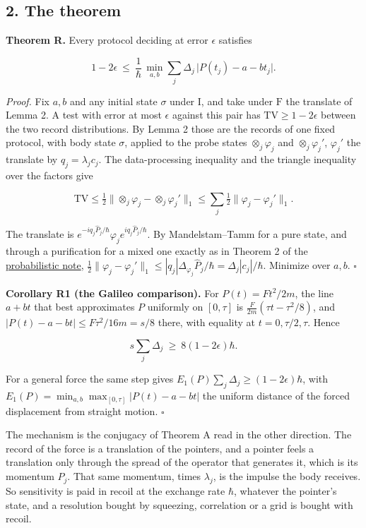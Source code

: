 \documentclass[11pt,a4paper]{article}
\begin{document}
\hypertarget{the-theorem}{%
\subsection{2. The theorem}\label{the-theorem}}

\textbf{Theorem R.} Every protocol deciding at error \(\epsilon\)
satisfies

\[1-2\epsilon\ \le\ \frac1\hbar\,\min_{a,b}\sum_j\Delta_j\,\bigl|P(t_j)-a-bt_j\bigr| .\]

\emph{Proof.} Fix \(a,b\) and any initial state \(\sigma\) under
\(\mathrm I\), and take under \(\mathrm F\) the translate of Lemma 2. A
test with error at most \(\epsilon\) against this pair has
\(\mathrm{TV}\ge1-2\epsilon\) between the two record distributions. By
Lemma 2 those are the records of one fixed protocol, with body state
\(\sigma\), applied to the probe states \(\otimes_j\varphi_j\) and
\(\otimes_j\varphi_j'\), \(\varphi_j'\) the translate by
\(q_j=\lambda_jc_j\). The data-processing inequality and the triangle
inequality over the factors give

\[\mathrm{TV}\le\tfrac12\bigl\|\otimes_j\varphi_j-\otimes_j\varphi_j'\bigr\|_1
\le\sum_j\tfrac12\|\varphi_j-\varphi_j'\|_1 .\]

The translate is
\(e^{-iq_j\hat P_j/\hbar}\varphi_je^{iq_j\hat P_j/\hbar}\). By
Mandelstam--Tamm for a pure state, and through a purification for a
mixed one exactly as in Theorem 2 of the
\href{planck-gap-probabilistic.md}{probabilistic note},
\(\frac12\|\varphi_j-\varphi_j'\|_1\le|q_j|\Delta_{\varphi_j}\hat P_j/\hbar=\Delta_j|c_j|/\hbar\).
Minimize over \(a,b\). \(\square\)

\textbf{Corollary R1 (the Galileo comparison).} For \(P(t)=Ft^2/2m\),
the line \(a+bt\) that best approximates \(P\) uniformly on \([0,\tau]\)
is \(\frac{F}{2m}(\tau t-\tau^2/8)\), and
\(|P(t)-a-bt|\le F\tau^2/16m=s/8\) there, with equality at
\(t=0,\tau/2,\tau\). Hence

\[s\sum_j\Delta_j\ \ge\ 8(1-2\epsilon)\hbar .\]

For a general force the same step gives
\(E_1(P)\sum_j\Delta_j\ge(1-2\epsilon)\hbar\), with
\(E_1(P)=\min_{a,b}\max_{[0,\tau]}|P(t)-a-bt|\) the uniform distance of
the forced displacement from straight motion. \(\square\)

The mechanism is the conjugacy of Theorem A read in the other direction.
The record of the force is a translation of the pointers, and a pointer
feels a translation only through the spread of the operator that
generates it, which is its momentum \(\hat P_j\). That same momentum,
times \(\lambda_j\), is the impulse the body receives. So sensitivity is
paid in recoil at the exchange rate \(\hbar\), whatever the pointer's
state, and a resolution bought by squeezing, correlation or a grid is
bought with recoil.
\end{document}
